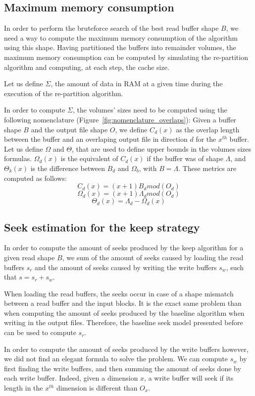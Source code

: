 \documentclass[conference]{IEEEtran}
\begin{document}
\subsection{Maximum memory consumption}
In order to perform the bruteforce search of the best read buffer shape $B$,
we need a way to compute the maximum memory consumption of the algorithm using
this shape.
Having partitioned the buffers into remainder volumes, the maximum memory
consumption can be computed by simulating the re-partition algorithm and
computing, at each step, the cache size.

Let us define $\Sigma$, the amount of data in RAM at a given time during the
execution of the re-partition algorithm.

In order to compute $\Sigma$, the volumes' sizes need to be computed using the
following nomenclature (Figure~\ref{fig:nomenclature_overlaps}):
Given a buffer shape $B$ and the output file shape $O$, we define $C_d(x)$ as
the overlap length between the buffer and an overlaping output file in direction
$d$ for the $x^{th}$ buffer. Let us define $\Omega$ and $\Theta$, that are used
to define upper bounds in the volumes sizes formulas. $\Omega_d(x)$ is the
equivalent of $C_d(x)$ if the buffer was of shape $\Lambda$, and $\Theta_k(x)$
is the difference between $B_d$ and $\Omega_b$, with $B=\Lambda$.
These metrics are computed as follows:
$$C_d(x) = (x+1)B_d mod(O_d)$$
$$\Omega_d(x) = (x+1)\Lambda_d mod(O_d)$$
$$\Theta_d(x) = \Lambda_d - \Omega_d(x)$$

\subsection{Seek estimation for the keep strategy}
In order to compute the amount of seeks produced by the keep algorithm
for a given read shape $B$, we sum of the amount of seeks caused by loading the
read buffers $s_r$ and the amount of seeks caused by writing the write
buffers $s_w$, such that $s=s_r+s_w$.

When loading the read buffers, the seeks occur in case of a shape mismatch
between a read buffer and the input blocks. It is the exact same problem than
when computing the amount of seeks produced by the baseline algorithm when
writing in the output files. Therefore, the baseline seek model presented
before can be used to compute $s_r$.

In order to compute the amount of seeks produced by the write buffers however,
we did not find an elegant formula to solve the problem. We can compute $s_w$
by first finding the write buffers, and then summing the amount of seeks done
by each write buffer. Indeed, given a dimension $x$, a write buffer will seek
if its length in the $x^{th}$ dimension is different than $O_x$.
\end{document}
